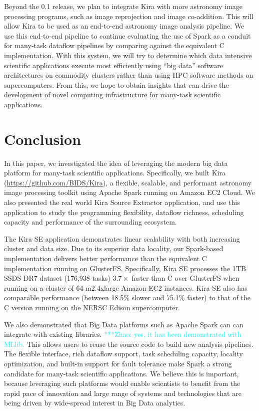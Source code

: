 \documentclass[conference]{IEEEtran}
\newcommand{\zhaonote}[1]{{\textcolor{cyan}    { ***Zhao:      #1 }}}
\newcommand{\zhaonote}[1]{}
\begin{document}
Beyond the 0.1 release, we plan to integrate Kira with more astronomy image processing
programs, such as image reprojection and image co-addition. This will allow Kira to be
used as an end-to-end astronomy image analysis pipeline. We use this end-to-end pipeline
to continue evaluating the use of Spark as a conduit for many-task dataflow pipelines by
comparing against the equivalent C implementation. With this system, we will try to determine
which data intensive scientific applications execute most efficiently using ``big data''
software architectures on commodity clusters rather than using HPC software methods on supercomputers.
From this, we hope to obtain insights that can drive the development of novel computing
infrastructure for many-task scientific applications.

\section{Conclusion}
\label{sec:Conclusion}

In this paper, we investigated the idea of leveraging the modern big data platform for many-task
scientific applications. Specifically, we built Kira (\url{https://github.com/BIDS/Kira}), a flexible, scalable,
and performant astronomy image processing toolkit using Apache Spark running on Amazon EC2 Cloud. We also presented
the real world Kira Source Extractor application, and use this application to study the programming
flexibility, dataflow richness, scheduling capacity and performance of the surrounding ecosystem.

The Kira SE application demonstrates linear scalability with both increasing cluster and data
size. Due to its superior data locality, our Spark-based implementation delivers better performance than the equivalent C 
implementation running on GlusterFS. Specifically, Kira SE processes the 1TB SSDS DR7 dataset (176,938 tasks)
$3.7\times$ faster than C over GlusterFS when running on a cluster of 64 m2.4xlarge Amazon
EC2 instances. Kira SE also has comparable performance (between 18.5\% slower and 75.1\% faster)
to that of the C version running on the NERSC Edison supercomputer.  

We also demonstrated that Big Data platforms such as Apache Spark can can integrate with existing libraries.
\zhaonote{yes, it has been demonstrated with MLlib.}
This allows users to reuse the source code to build new analysis pipelines.
The flexible interface, rich dataflow support, task scheduling capacity, locality optimization, and built-in support for fault tolerance make Spark a 
strong candidate for many-task scientific applications. 
We believe this is important, because leveraging such platforms would enable scientists to benefit from the rapid pace of innovation and large range of systems and technologies that are being driven by wide-spread interest in Big Data analytics.
\end{document}
